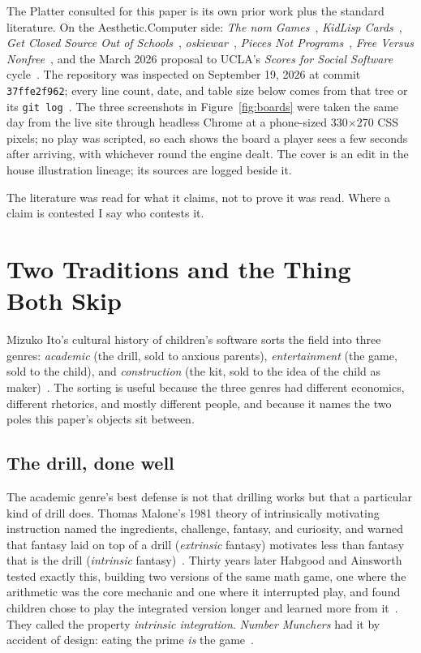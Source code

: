 \documentclass[10pt,letterpaper,twocolumn]{article}
\newcommand{\acdot}{{\color{acpink}.}}
\newcommand{\ac}{Aesthetic{\acdot}Computer}
\newcommand{\code}[1]{\texttt{#1}}
\begin{document}
The Platter consulted for this paper is its own prior work plus the standard literature. On the \ac{} side: \emph{The nom Games}~\citep{scudder2026nom}, \emph{KidLisp Cards}~\citep{scudder2026kidlispcards}, \emph{Get Closed Source Out of Schools}~\citep{scudder2026openschools}, \emph{oskiewar}~\citep{scudder2026oskiewar}, \emph{Pieces Not Programs}~\citep{scudder2026pieces}, \emph{Free Versus Nonfree}~\citep{scudder2026freevsopen}, and the March 2026 proposal to UCLA's \emph{Scores for Social Software} cycle~\citep{sosoft2026proposal}. The repository was inspected on September 19, 2026 at commit \code{37ffe2f962}; every line count, date, and table size below comes from that tree or its \code{git log}~\citep{acrepo2026}. The three screenshots in Figure~\ref{fig:boards} were taken the same day from the live site through headless Chrome at a phone-sized 330$\times$270 CSS pixels; no play was scripted, so each shows the board a player sees a few seconds after arriving, with whichever round the engine dealt. The cover is an edit in the house illustration lineage; its sources are logged beside it.

The literature was read for what it claims, not to prove it was read. Where a claim is contested I say who contests it.

\section{Two Traditions and the Thing Both Skip}
\label{sec:traditions}

Mizuko Ito's cultural history of children's software sorts the field into three genres: \emph{academic} (the drill, sold to anxious parents), \emph{entertainment} (the game, sold to the child), and \emph{construction} (the kit, sold to the idea of the child as maker)~\citep{ito2009engineering}. The sorting is useful because the three genres had different economics, different rhetorics, and mostly different people, and because it names the two poles this paper's objects sit between.

\subsection{The drill, done well}

The academic genre's best defense is not that drilling works but that a particular kind of drill does. Thomas Malone's 1981 theory of intrinsically motivating instruction named the ingredients, challenge, fantasy, and curiosity, and warned that fantasy laid on top of a drill (\emph{extrinsic} fantasy) motivates less than fantasy that is the drill (\emph{intrinsic} fantasy)~\citep{malone1981thinking}. Thirty years later Habgood and Ainsworth tested exactly this, building two versions of the same math game, one where the arithmetic was the core mechanic and one where it interrupted play, and found children chose to play the integrated version longer and learned more from it~\citep{habgood2011motivating}. They called the property \emph{intrinsic integration}. \emph{Number Munchers} had it by accident of design: eating the prime \emph{is} the game~\citep{mecc1986number,mecc1985word}.
\end{document}
